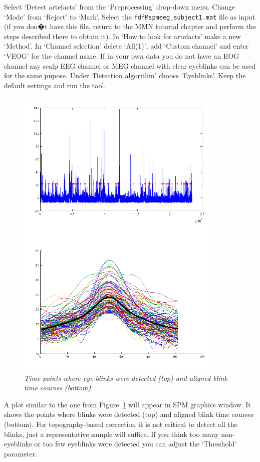 Select `Detect artefacts' from the `Preprocessing' drop-down menu. Change `Mode' from `Reject' to `Mark'. Select the \texttt{fdfMspmeeg\_subject1.mat} file as input (if you don�t have this file, return to the MMN tutorial chapter and perform the steps described there to obtain it). In `How to look for artefacts' make a new `Method'. In `Channel selection' delete `All(1)', add `Custom channel' and enter `VEOG' for the channel name. If in your own data you do not have an EOG channel any scalp EEG channel or MEG channel with clear eyeblinks can be used for the same pupose. Under `Detection algorithm' choose `Eyeblinks'. Keep the default settings and run the tool. 

\begin{figure}
\begin{center}
\includegraphics[width=100mm]{meeg_artefact/figure2}
\caption{\em Time points where eye blinks were detected (top) and aligned blink time courses (bottom). \label{artefact_fig2}}
\end{center}
\end{figure}
 
A plot similar to the one from Figure~\ref{artefact_fig2} will appear in SPM graphics window. It shows the points where blinks were detected (top) and aligned blink time courses (bottom). For topography-based correction it is not critical to detect all the blinks, just a representative sample will suffice. If you think too many non-eyeblinks or too few eyeblinks were detected you can adjust the `Threshold' parameter. 

